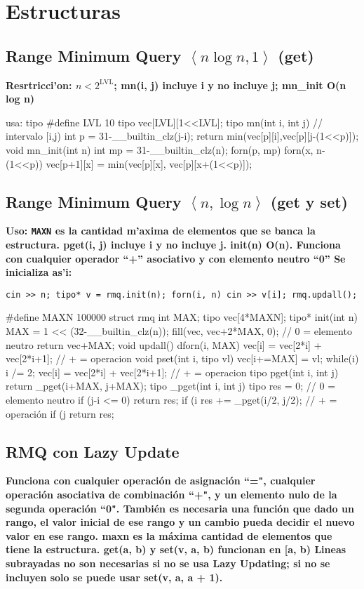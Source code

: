\documentclass[10pt,landscape,twocolumn,a4paper,notitlepage]{article}
\def\nbcoment#1{\begin{small}\textbf{#1}\end{small}}
\begin{document}
\section{Estructuras}
\subsection{Range Minimum Query $\left<n \log n, 1\right>$ (get)}
\nbcoment{Resrtricci'on: $n < 2^{\mathrm{LVL}}$; mn(i, j) incluye i y \textbf{no} incluye j; mn\_init O(n log n)}
\begin{code}
usa: tipo
#define LVL 10
tipo vec[LVL][1<<LVL];
tipo mn(int i, int j) { // intervalo [i,j)
	int p = 31-__builtin_clz(j-i);
	return min(vec[p][i],vec[p][j-(1<<p)]);
}
void mn_init(int n) {
	int mp = 31-__builtin_clz(n);
	forn(p, mp) forn(x, n-(1<<p)) vec[p+1][x] = min(vec[p][x], vec[p][x+(1<<p)]);
}
\end{code}
\subsection{Range Minimum Query $\left<n, \log n\right>$ (get y set)}
\nbcoment{Uso: \texttt{MAXN} es la cantidad m'axima de elementos que se banca la estructura. pget(i, j) incluye i y \textbf{no} incluye j. init(n) O(n). Funciona con cualquier operador ``+'' asociativo y con elemento neutro ``0'' Se inicializa as'i:}
\verb!cin >> n; tipo* v = rmq.init(n); forn(i, n) cin >> v[i]; rmq.updall();!
\begin{code}
#define MAXN 100000
struct rmq {
	int MAX;
	tipo vec[4*MAXN];
	tipo* init(int n) {
		MAX = 1 << (32-__builtin_clz(n)); 
		fill(vec, vec+2*MAX, 0); // 0 = elemento neutro
		return vec+MAX;
	}
	void updall() { dforn(i, MAX) vec[i] = vec[2*i] + vec[2*i+1]; } // + = operacion
	void pset(int i, tipo vl) {
		vec[i+=MAX] = vl;
		while(i) { i /= 2; vec[i] = vec[2*i] + vec[2*i+1]; } // + = operacion
	}
	tipo pget(int i, int j) { return _pget(i+MAX, j+MAX); }
	tipo _pget(int i, int j) {
		tipo res = 0;             // 0 = elemento neutro
		if (j-i <= 0) return res;
		if (i%
		res += _pget(i/2, j/2);   // + = operaci\'on
		if (j%
		return res;
	}
}
\end{code}
\subsection{RMQ con Lazy Update}
{\bf \footnotesize Funciona con cualquier operaci\'on de asignaci\'on ``=", cualquier operaci\'on asociativa de combinaci\'on ``+", y un elemento nulo de la segunda operaci\'on ``0".
Tambi\'en es necesaria una funci\'on que dado un rango, el valor inicial de ese rango y un cambio pueda decidir el nuevo valor en ese rango.
maxn es la m\'axima cantidad de elementos que tiene la estructura. get(a, b) y set(v, a, b) funcionan en [a, b) Lineas subrayadas no son necesarias si no se usa
Lazy Updating; si no se incluyen solo se puede usar set(v, a, a + 1).}
\end{document}
